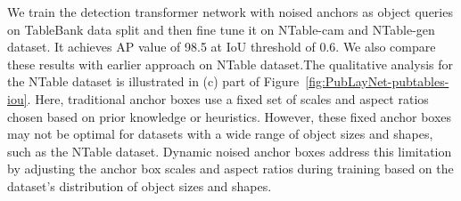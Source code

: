 \documentclass[sn-mathphys]{sn-jnl}\jyear{2021}\theoremstyle{thmstyleone}\newtheorem{theorem}{Theorem}\newtheorem{proposition}[theorem]{Proposition}\theoremstyle{thmstyletwo}\newtheorem{example}{Example}\newtheorem{remark}{Remark}\theoremstyle{thmstylethree}\newtheorem{definition}{Definition}\usepackage{amsmath}
\begin{document}
We train the detection transformer network with noised anchors as object queries on TableBank data split and then fine tune it on NTable-cam and NTable-gen dataset. It achieves AP value of 98.5 at IoU threshold of 0.6. We also compare these results with earlier approach on NTable dataset.The qualitative analysis for the NTable dataset is illustrated in (c) part
of Figure~\ref{fig:PubLayNet-pubtables-iou}. Here, traditional anchor boxes use a fixed set of scales and aspect ratios chosen based on prior knowledge or heuristics. However, these fixed anchor boxes may not be optimal for datasets with a wide range of object sizes and shapes, such as the NTable dataset. Dynamic noised anchor boxes address this limitation by adjusting the anchor box scales and aspect ratios during training based on the dataset's distribution of object sizes and shapes.
\end{document}
